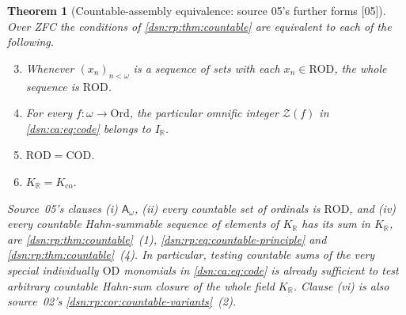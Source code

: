 \documentclass[11pt,a4paper]{article}
\numberwithin{equation}{section}
\newtheorem{theorem}{Theorem}[section]
\theoremstyle{definition}
\theoremstyle{remark}
\newcommand{\Ord}{\mathrm{Ord}}
\newcommand{\OD}{\mathrm{OD}}
\newcommand{\R}{\mathbb R}
\newcommand{\src}[1]{\textup{\textsf{\small[#1]}}}
\newcommand{\ROD}{\mathrm{ROD}}
\newcommand{\COD}{\mathrm{COD}}
\newcommand{\KR}{K_{\R}}
\newcommand{\IR}{I_{\R}}
\newcommand{\Kco}{K_{\mathrm{co}}}
\newcommand{\Asm}{\mathsf A_{\omega}}
\newcommand{\Zc}{\mathcal Z}
\begin{document}
\begin{theorem}[Countable-assembly equivalence: source 05's further forms \src{05}]
\label{dsn:ca:thm:assembly}
Over ZFC the conditions of \cref{dsn:rp:thm:countable} are equivalent to
each of the following.
\begin{enumerate}[label=\textup{(\roman*)}]
\setcounter{enumi}{2}
\item Whenever $(x_n)_{n<\omega}$ is a sequence of sets with each
$x_n\in\ROD$, the whole sequence is $\ROD$.
\setcounter{enumi}{4}
\item For every $f:\omega\to\Ord$, the particular omnific integer
$\Zc(f)$ in \eqref{dsn:ca:eq:code} belongs to $\IR$.
\item $\ROD=\COD$.
\item $\KR=\Kco$.
\end{enumerate}
Source~05's clauses \textup{(i)} $\Asm$, \textup{(ii)} every countable set of
ordinals is $\ROD$, and \textup{(iv)} every countable Hahn-summable sequence
of elements of $\KR$ has its sum in $\KR$, are \cref{dsn:rp:thm:countable}~(1),
\eqref{dsn:rp:eq:countable-principle} and \cref{dsn:rp:thm:countable}~(4). In
particular, testing countable sums of the very special individually $\OD$
monomials in \eqref{dsn:ca:eq:code} is already sufficient to test arbitrary
countable Hahn-sum closure of the whole field $\KR$. Clause \textup{(vi)} is
also source~02's \cref{dsn:rp:cor:countable-variants}~(2).
\end{theorem}
\end{document}
